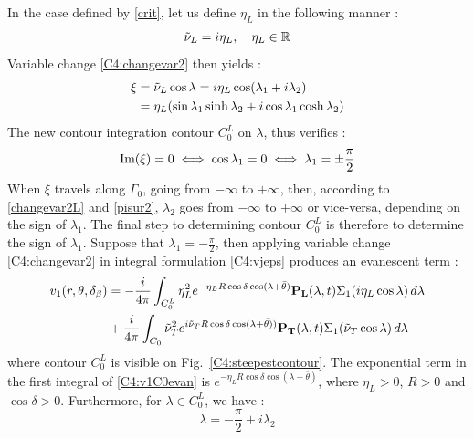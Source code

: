 In the case defined by \eqref{crit}, let us define $\eta_L$ in the following manner :
\begin{equation}
\tilde{\nu}_L=i\eta_L, \quad \eta_L \in \mathbb{R}
\label{defetaL}
\end{equation}
Variable change \eqref{C4:changevar2} then yields :
\begin{equation}
\begin{split}
\xi&=\tilde{\nu}_L\cos\lambda=i\eta_L\cos(\lambda_1+i\lambda_2)\\
&=\eta_L(\sin\lambda_1\sinh\lambda_2+i\cos\lambda_1\cosh\lambda_2)
\end{split}
\label{changevar2L}
\end{equation}
The new contour integration contour $C_0^L$ on $\lambda$, thus verifies :
\begin{equation}
\rm Im(\xi)=0 \iff \cos\lambda_1=0 \iff \lambda_1=\pm \frac{\pi}{2}
\label{pisur2}
\end{equation}
When $\xi$ travels along $\Gamma_0$, going from $-\infty$ to $+\infty$, then, according to \eqref{changevar2L} and \eqref{pisur2}, $\lambda_2$ goes from $-\infty$ to $+\infty$ or vice-versa, depending on the sign of $\lambda_1$. The final step to determining contour $C_0^L$ is therefore to determine the sign of $\lambda_1$. Suppose that $\lambda_1=-\frac{\pi}{2}$, then applying variable change \eqref{C4:changevar2} in integral formulation \eqref{C4:vjeps} produces an evanescent term :
\begin{equation}
\begin{split}
v_1(r,\theta,\delta_{\beta})&=-\frac{i}{4\pi} \int_{C_0^L}\eta_L^2 e^{-\eta_L R\cos\delta\cos(\lambda+\bar{\theta})}\mathbf{ P_L}(\lambda,t)\Sigma_1(i\eta_L\cos\lambda) \, d\lambda\\
&+\frac{i}{4\pi} \int_{C_0}\tilde{\nu}_T^2 e^{i\tilde{\nu}_T R\cos\delta\cos(\lambda+\bar{\theta)})}\mathbf{ P_T}(\lambda,t)\Sigma_1(\tilde{\nu}_T\cos\lambda) \, d\lambda
\end{split}
\label{C4:v1C0evan}
\end{equation}
where contour $C_0^L$ is visible on Fig.~\ref{C4:steepestcontour}. The exponential term in the first integral of \eqref{C4:v1C0evan} is $e^{-\eta_L R\cos\delta\cos(\lambda+\bar{\theta})}$, where $\eta_L>0$, $R>0$ and $\cos\delta>0$. Furthermore, for $\lambda \in C_0^L$, we have :
\begin{equation}
\lambda=-\dfrac{\pi}{2}+i\lambda_2
\end{equation}
